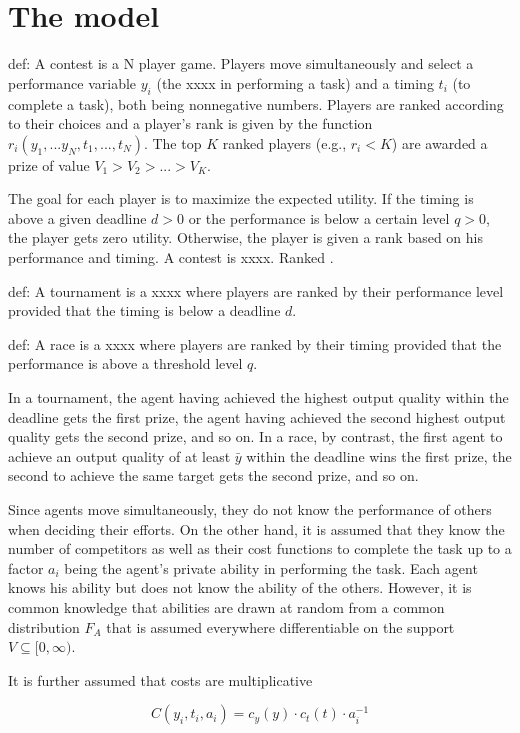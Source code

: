 \documentclass[12pt,]{article}
\begin{document}
\section{The model}\label{the-model}

def: A contest is a N player game. Players move simultaneously and
select a performance variable \(y_i\) (the xxxx in performing a task)
and a timing \(t_i\) (to complete a task), both being nonnegative
numbers. Players are ranked according to their choices and a player's
rank is given by the function \(r_i(y_1,...y_N, t_1, ..., t_N)\). The
top \(K\) ranked players (e.g., \(r_i<K\)) are awarded a prize of value
\(V_1 > V_2 > ... > V_K\).

The goal for each player is to maximize the expected utility. If the
timing is above a given deadline \(d>0\) or the performance is below a
certain level \(q>0\), the player gets zero utility. Otherwise, the
player is given a rank based on his performance and timing. A contest is
xxxx. Ranked .

def: A tournament is a xxxx where players are ranked by their
performance level provided that the timing is below a deadline \(d\).

def: A race is a xxxx where players are ranked by their timing provided
that the performance is above a threshold level \(q\).

In a tournament, the agent having achieved the highest output quality
within the deadline gets the first prize, the agent having achieved the
second highest output quality gets the second prize, and so on. In a
race, by contrast, the first agent to achieve an output quality of at
least \({\bar y}\) within the deadline wins the first prize, the second
to achieve the same target gets the second prize, and so on.

Since agents move simultaneously, they do not know the performance of
others when deciding their efforts. On the other hand, it is assumed
that they know the number of competitors as well as their cost functions
to complete the task up to a factor \(a_i\) being the agent's private
ability in performing the task. Each agent knows his ability but does
not know the ability of the others. However, it is common knowledge that
abilities are drawn at random from a common distribution \(F_A\) that is
assumed everywhere differentiable on the support
\(V\subseteq [0, \infty)\).

It is further assumed that costs are multiplicative

\[C(y_i, t_i, a_i) = {c_{y}}(y) \cdot {c_{t}}(t)  \cdot a_i^{-1}\]
\end{document}
